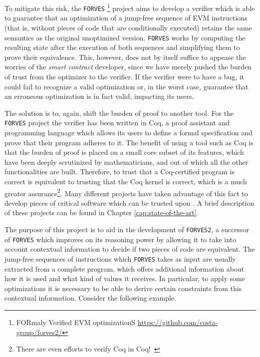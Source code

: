 To mitigate this risk, the \verb|FORVES|
\footnote{FORmaly Verified EVM optimizationS \url{https://github.com/costa-group/forves2/}}
project aims to develop a verifier which is able to guarantee that an optimization of a jump-free
sequence of EVM instructions (that is, without pieces of code that are conditionally executed)
retains the same semantics as the original unoptimized version. \verb|FORVES| works by computing the 
resulting state after the execution of both sequences and simplifying them to prove their
equivalence.
This, however, does not by itself suffice to appease the worries of the \emph{smart contract} 
developer, since we have merely pushed the burden of trust from the optimizer to the verifier. If the 
verifier were to have a bug, it could fail to recognize a valid optimization or, in the worst case, 
guarantee that an erroneous optimization is in fact valid, impacting its users.

The solution is to, again, shift the burden of proof to another tool. For the \verb|FORVES| project the 
verifier has been written in Coq, a proof assistant and programming language which allows its users to 
define a formal specification and prove that their program adheres to it. The benefit of using a tool
such as Coq is that the burden of proof is placed on a small core subset of its features, which have
been deeply scrutinized by mathematicians, and out of which all the other functionalities are built.
Therefore, to trust that a Coq-certified program is correct is equivalent to trusting that the Coq  
kernel is correct, which is a much greater 
assurance\footnote{There are even efforts to verify Coq in Coq!\ \cite{sozeau:hal-04077552}}. 
Many different projects have taken advantage of this fact to develop pieces of critical software which
can be trusted upon \cite{ConCert,FiatCryptoSP19,CompCert,Iris,Cosette}. A brief description of these projects can be found in Chapter 
    \ref{cap:state-of-the-art}.

The purpose of this project is to aid in the development of \verb|FORVES2|, a successor of \verb|FORVES|
which improves on its reasoning power by allowing it to take into account contextual information to
decide if two pieces of code are equivalent. The jump-free sequences of instructions which \verb|FORVES|
takes as input are usually extracted from a complete program, which offers additional information about
how it is used and what kind of values it receives. In particular, to apply some optimizations it is
necessary to be able to derive certain constraints from this contextual information. Consider the 
following example.

